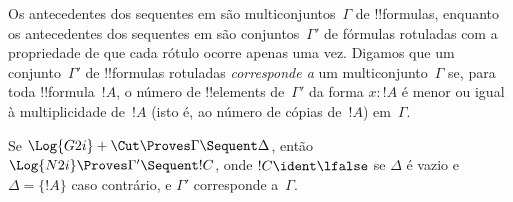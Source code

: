 \documentclass[../../../include/open-logic-section]{subfiles}
\begin{document}


Os antecedentes dos sequentes em  são multiconjuntos~$\Gamma$
de !!{formula}s, enquanto os antecedentes dos sequentes em 
são conjuntos~$\Gamma'$ de fórmulas rotuladas com a propriedade de que
cada rótulo ocorre apenas uma vez. Digamos que um conjunto~$\Gamma'$ de
!!{formula}s rotuladas \emph{corresponde a} um multiconjunto~$\Gamma$
se, para toda !!{formula}~$!A$, o número de !!{element}s de~$\Gamma'$ da
forma $x : !A$ é menor ou igual à multiplicidade de~$!A$ (isto é, ao
número de cópias de~$!A$) em~$\Gamma$.

\begin{prop}
Se $\Log{G2i} + \Cut \Proves \Gamma \Sequent \Delta$, então $\Log{N2i}
\Proves \Gamma' \Sequent !C$, onde $!C \ident \lfalse$ se $\Delta$ é
vazio e $\Delta = \{!A\}$ caso contrário, e $\Gamma'$ corresponde
a~$\Gamma$.
\end{prop}
\end{document}
